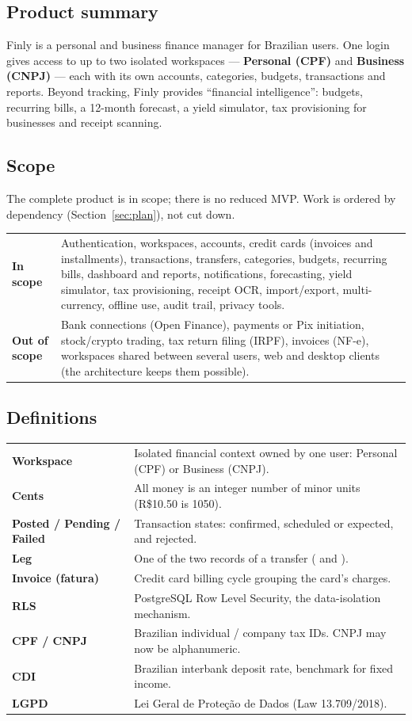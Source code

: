 \documentclass[11pt,a4paper]{article}
\newcommand{\code}[1]{\texttt{\detokenize{#1}}}
\begin{document}
\subsection{Product summary}
Finly is a personal and business finance manager for Brazilian users. One login gives access to up to two isolated workspaces --- \textbf{Personal (CPF)} and \textbf{Business (CNPJ)} --- each with its own accounts, categories, budgets, transactions and reports. Beyond tracking, Finly provides ``financial intelligence'': budgets, recurring bills, a 12-month forecast, a yield simulator, tax provisioning for businesses and receipt scanning.

\subsection{Scope}
The complete product is in scope; there is no reduced MVP. Work is ordered by dependency (Section~\ref{sec:plan}), not cut down.

\begin{tabularx}{\textwidth}{@{}>{\bfseries}l X@{}}
\toprule
In scope & Authentication, workspaces, accounts, credit cards (invoices and installments), transactions, transfers, categories, budgets, recurring bills, dashboard and reports, notifications, forecasting, yield simulator, tax provisioning, receipt OCR, import/export, multi-currency, offline use, audit trail, privacy tools. \\
Out of scope & Bank connections (Open Finance), payments or Pix initiation, stock/crypto trading, tax return filing (IRPF), invoices (NF-e), workspaces shared between several users, web and desktop clients (the architecture keeps them possible). \\
\bottomrule
\end{tabularx}

\subsection{Definitions}
\begin{tabularx}{\textwidth}{@{}>{\bfseries}l X@{}}
\toprule
Workspace & Isolated financial context owned by one user: Personal (CPF) or Business (CNPJ). \\
Cents & All money is an integer number of minor units (R\$10.50 is 1050). \\
Posted / Pending / Failed & Transaction states: confirmed, scheduled or expected, and rejected. \\
Leg & One of the two records of a transfer (\code{transfer_out} and \code{transfer_in}). \\
Invoice (fatura) & Credit card billing cycle grouping the card's charges. \\
RLS & PostgreSQL Row Level Security, the data-isolation mechanism. \\
CPF / CNPJ & Brazilian individual / company tax IDs. CNPJ may now be alphanumeric. \\
CDI & Brazilian interbank deposit rate, benchmark for fixed income. \\
LGPD & Lei Geral de Prote\c{c}\~ao de Dados (Law 13.709/2018). \\
\bottomrule
\end{tabularx}
\end{document}

